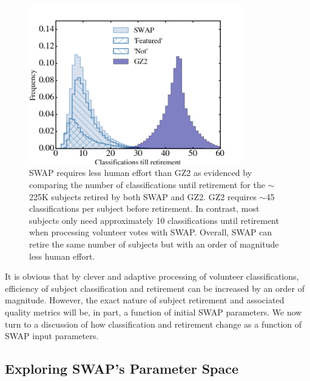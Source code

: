 \documentclass[twocolumn]{aastex6}
\begin{document}
\begin{figure}[t!]
\includegraphics[width=3.65in]{figures/GZX_clicks_till_retired_baseline.png}
\caption{SWAP requires less human effort than GZ2 as evidenced by comparing the number of classifications until retirement for the $\sim$225K subjects retired by both SWAP and GZ2. GZ2 requires $\sim$45 classifications per subject before retirement. In contrast, most subjects only need approximately 10 classifications until retirement when processing volunteer votes with SWAP. Overall, SWAP can retire the same number of subjects but with an order of magnitude less human effort.  \label{fig: swap vote distributions}}
\end{figure}



 It is obvious that by clever and adaptive processing of volunteer classifications, 
efficiency of subject classification and retirement can be increased by an order of magnitude. 
However, the exact nature of subject retirement and associated quality metrics will
be, in part, a function of initial SWAP parameters. We now turn to a discussion of 
how classification and retirement change as a function of SWAP input parameters. 


\subsection{Exploring SWAP's Parameter Space}
\end{document}
